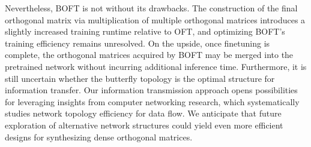 Nevertheless, BOFT is not without its drawbacks. The construction of the final orthogonal matrix via multiplication of multiple orthogonal matrices introduces a slightly increased training runtime relative to OFT, and optimizing BOFT’s training efficiency remains unresolved. On the upside, once finetuning is complete, the orthogonal matrices acquired by BOFT may be merged into the pretrained network without incurring additional inference time. Furthermore, it is still uncertain whether the butterfly topology is the optimal structure for information transfer. Our information transmission approach opens possibilities for leveraging insights from computer networking research, which systematically studies network topology efficiency for data flow. We anticipate that future exploration of alternative network structures could yield even more efficient designs for synthesizing dense orthogonal matrices.

